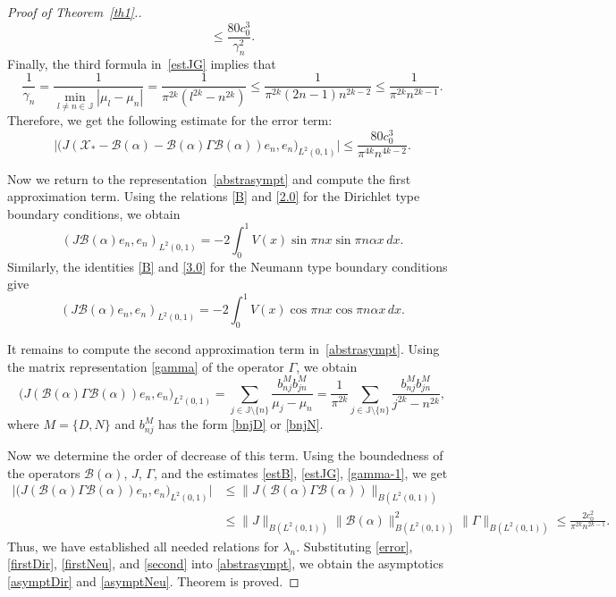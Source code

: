 \documentclass[11pt,centertags,reqno,twoside]{amsart}
\numberwithin{equation}{section}
\theoremstyle{definition}
\theoremstyle{remark}
\begin{document}
\begin{proof}[Proof of Theorem~\ref{th1}.]
\begin{equation}
\leqslant \frac{80c_0^3}{\gamma_n^2}.
\end{equation}
Finally, the third formula in~\eqref{estJG} implies that
\begin{equation}\label{gamma-1}
\frac{1}{\gamma_n}=\frac{1}{\min\limits_{l\ne n\in\mathbb{J}}|\mu_l-\mu_n|}=
\frac{1}{\pi^{2k}(l^{2k}-n^{2k})}\leqslant \frac{1}{\pi^{2k}(2n-1)n^{2k-2}}\leqslant
\frac{1}{\pi^{2k}n^{2k-1}}.
\end{equation}
Therefore, we get the following estimate for the error term:
\begin{equation}\label{error}
\Big|\big(J(\mathcal{X}_*-\mathcal{B}(\alpha)
-\mathcal{B}(\alpha)\Gamma\mathcal{B}(\alpha))e_n, e_n\big)_{L^2(0, 1)}\Big|
\leqslant \frac{80c_0^3}{\pi^{4k}n^{4k-2}}.
\end{equation}

Now we return to the representation~\eqref{abstrasympt} and compute the first
approximation term. Using the relations \eqref{B} and \eqref{2.0} for
the Dirichlet type boundary conditions, we obtain
\begin{equation}\label{firstDir}
(J\mathcal{B}(\alpha)e_n, e_n)_{L^2(0, 1)}=-2\int_0^1V(x)\sin\pi nx\sin\pi n\alpha x\,dx.
\end{equation}
Similarly, the identities \eqref{B} and \eqref{3.0} for the Neumann type boundary
conditions give
\begin{equation}\label{firstNeu}
(J\mathcal{B}(\alpha)e_n, e_n)_{L^2(0, 1)}=-2\int_0^1V(x)\cos\pi nx\cos\pi n\alpha x\,dx.
\end{equation}

It remains to compute the second approximation term in~\eqref{abstrasympt}. Using
the matrix representation \eqref{gamma} of the operator $\Gamma$, we obtain
\begin{equation}\label{second}
\big(J(\mathcal{B}(\alpha)\Gamma\mathcal{B}(\alpha))e_n, e_n\big)_{L^2(0, 1)}
=\sum_{j\in\mathbb{J}\setminus\{n\}}\frac{b_{nj}^Mb_{jn}^M}{\mu_j-\mu_n}
=\frac{1}{\pi^{2k}}\sum_{j\in\mathbb{J}\setminus\{n\}}\frac{b_{nj}^Mb_{jn}^M}{j^{2k}-n^{2k}},
\end{equation}
where $M=\{D, N\}$ and $b_{nj}^M$ has the form \eqref{bnjD} or \eqref{bnjN}.

Now we determine the order of decrease of this term. Using the boundedness of the operators
$\mathcal{B}(\alpha)$, $J$, $\Gamma$, and the estimates \eqref{estB}, \eqref{estJG},
\eqref{gamma-1}, we get
\begin{align*}
\Big|\big(J(\mathcal{B}(\alpha)\Gamma\mathcal{B}(\alpha))e_n, e_n\big)_{L^2(0, 1)}\Big|
&\leqslant \|J(\mathcal{B}(\alpha)\Gamma\mathcal{B}(\alpha))\|_{B(L^2(0, 1))} \\
&\leqslant \|J\|_{B(L^2(0, 1))}\|\mathcal{B}(\alpha)\|_{B(L^2(0, 1))}^2
\|\Gamma\|_{B(L^2(0, 1))}\leqslant \frac{2c_0^2}{\pi^{2k}n^{2k-1}}.
\end{align*}
Thus, we have established all needed relations for $\lambda_n$. Substituting
\eqref{error}, \eqref{firstDir}, \eqref{firstNeu}, and \eqref{second}
into \eqref{abstrasympt}, we obtain the asymptotics \eqref{asymptDir} and \eqref{asymptNeu}.
Theorem is proved.
\end{proof}
\end{document}
